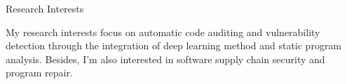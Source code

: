 \begin{rubric}{Research Interests}
\parbox{\linewidth}{
My research interests focus on automatic code auditing and vulnerability detection through the integration of deep learning method and static program analysis. Besides, I'm also interested in software supply chain security and program repair.
}
\end{rubric}